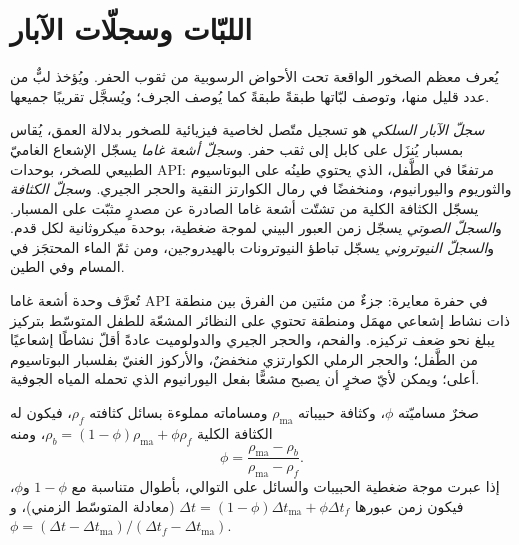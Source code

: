 \section{اللبّات وسجلّات الآبار}\label{sec:b3:facies-models:logs}

يُعرف معظم الصخور الواقعة تحت الأحواض الرسوبية من ثقوب الحفر. ويُؤخذ لبٌّ من عدد قليل منها،
وتوصف لبّاتها طبقةً طبقةً كما يُوصف الجرف؛ ويُسجَّل تقريبًا
جميعها.

\begin{definition}\label{def:b3:facies-models:wireline}
\emph{سجلّ الآبار السلكي} هو تسجيل متّصل لخاصية
فيزيائية للصخور بدلالة العمق، يُقاس بمسبار يُنزَل على
كابل إلى ثقب حفر. و\emph{سجلّ أشعة غاما} يسجّل
الإشعاع الغاميّ الطبيعي للصخر، بوحدات API: مرتفعًا في
الطَّفل، الذي يحتوي طينُه على البوتاسيوم والثوريوم واليورانيوم، ومنخفضًا في
رمال الكوارتز النقية والحجر الجيري. و\emph{سجلّ الكثافة} يسجّل
الكثافة الكلية من تشتّت أشعة غاما الصادرة عن
مصدرٍ مثبّت على المسبار. و\emph{السجلّ الصوتي} يسجّل
زمن العبور البيني لموجة ضغطية، بوحدة ميكروثانية لكل قدم.
و\emph{السجلّ النيوتروني} يسجّل تباطؤ النيوترونات
بالهيدروجين، ومن ثمّ الماء المحتجَز في المسام وفي الطين.
\end{definition}

تُعرَّف وحدة أشعة غاما API في حفرة معايرة: جزءٌ من مئتين من
الفرق بين منطقة ذات نشاط إشعاعي مهمَل ومنطقة
تحتوي على النظائر المشعّة للطفل المتوسّط بتركيز يبلغ نحو ضعف تركيزه. والفحم،
والحجر الجيري والدولوميت عادةً أقلّ نشاطًا إشعاعيًا من الطَّفل؛ والحجر الرملي الكوارتزي منخفضٌ،
والأركوز الغنيّ بفلسبار البوتاسيوم أعلى؛ ويمكن لأيّ صخرٍ أن يصبح
مشعًّا بفعل اليورانيوم الذي تحمله المياه الجوفية.

\begin{proposition}\label{prop:b3:facies-models:porosity}
صخرٌ مساميّته $\phi$، وكثافة حبيباته $\rho_{\mathrm{ma}}$
ومساماته مملوءة بسائل كثافته $\rho_f$، فيكون له الكثافة الكلية
$\rho_b = (1 - \phi)\rho_{\mathrm{ma}} + \phi\rho_f$، ومنه
\[
\phi = \frac{\rho_{\mathrm{ma}} - \rho_b}{\rho_{\mathrm{ma}} - \rho_f}.
\]
إذا عبرت موجة ضغطية الحبيبات والسائل على التوالي، بأطوال
متناسبة مع $1 - \phi$ و$\phi$، فيكون زمن عبورها
$\Delta t = (1 - \phi)\Delta t_{\mathrm{ma}} + \phi\Delta t_f$ (معادلة
المتوسّط الزمني)، و$\phi = (\Delta t - \Delta
t_{\mathrm{ma}})/(\Delta t_f - \Delta t_{\mathrm{ma}})$.
\end{proposition}

